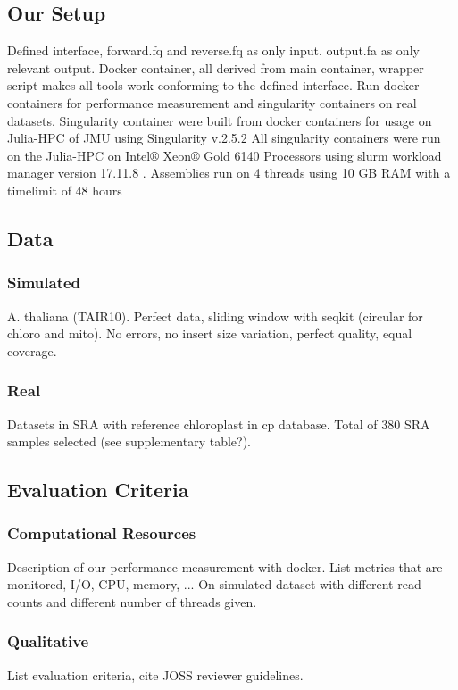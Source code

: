 \documentclass{bmcart}
\begin{document}
\subsection*{Our Setup}
Defined interface, forward.fq and reverse.fq as only input. output.fa as only relevant output.
Docker container, all derived from main container, wrapper script makes all tools work conforming to the defined interface. Run docker containers for performance measurement and singularity containers on real datasets.
Singularity container were built from docker containers for usage on Julia-HPC of JMU using Singularity v.2.5.2 \cite{kurtzer2017singularity}
All singularity containers were run on the Julia-HPC on Intel® Xeon® Gold 6140 Processors using slurm workload manager version 17.11.8 \cite{Jette02slurm}. Assemblies run on 4 threads using 10 GB RAM with a timelimit of 48 hours 



\subsection*{Data}
\subsubsection*{Simulated}
A. thaliana (TAIR10). Perfect data, sliding window with seqkit (circular for chloro and mito). No errors, no insert size variation, perfect quality, equal coverage.

\subsubsection*{Real}
Datasets in SRA with reference chloroplast in cp database.
Total of 380 SRA samples selected (see supplementary table?).

\subsection*{Evaluation Criteria}
\subsubsection*{Computational Resources}
Description of our performance measurement with docker. List metrics that are monitored, I/O, CPU, memory, ...
On simulated dataset with different read counts and different number of threads given.

\subsubsection*{Qualitative}
List evaluation criteria, cite JOSS reviewer guidelines.
\end{document}
